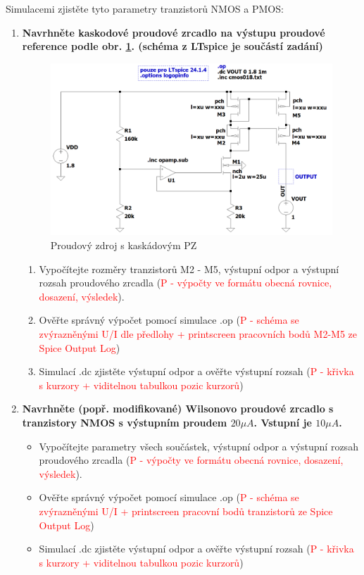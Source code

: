 Simulacemi zjistěte tyto parametry tranzistorů NMOS a PMOS:

\begin{enumerate}
    \item {\bf Navrhněte kaskodové proudové zrcadlo na výstupu proudové reference podle obr. \ref{fig:sch_zadani}. (schéma z LTspice je součástí zadání)}
    \begin{figure}[h]
        \centering
        \includegraphics[height=0.3\textheight]{text/img/zadani.png}
        \caption{\label{fig:sch_zadani} Proudový zdroj s kaskádovým PZ}
    \end{figure}
    \begin{enumerate}
        \item Vypočítejte rozměry tranzistorů M2 - M5, výstupní odpor a výstupní rozsah proudového zrcadla (\textcolor{red}{P - výpočty ve formátu obecná rovnice, dosazení, výsledek}).
        \item Ověřte správný výpočet pomocí simulace .op (\textcolor{red}{P - schéma se zvýrazněnými U/I dle předlohy + printscreen pracovních bodů M2-M5 ze Spice Output Log})
        \item Simulací .dc zjistěte výstupní odpor a ověřte výstupní rozsah (\textcolor{red}{P - křivka s kurzory + viditelnou tabulkou pozic kurzorů})
    \end{enumerate}
    \item {\bf Navrhněte (popř. modifikované) Wilsonovo proudové zrcadlo s tranzistory NMOS s výstupním proudem \(20 \mu A\). Vstupní je \(10\mu A\).}
    \begin{itemize}
        \item Vypočítejte parametry všech součástek, výstupní odpor a výstupní rozsah proudového zrcadla (\textcolor{red}{P - výpočty ve formátu obecná rovnice, dosazení, výsledek}).
        \item Ověřte správný výpočet pomocí simulace .op (\textcolor{red}{P - schéma se zvýrazněnými U/I + printscreen pracovní bodů tranzistorů ze Spice Output Log})
        \item Simulací .dc zjistěte výstupní odpor a ověřte výstupní rozsah (\textcolor{red}{P - křivka s kurzory + viditelnou tabulkou pozic kurzorů})
    \end{itemize}
\end{enumerate}
